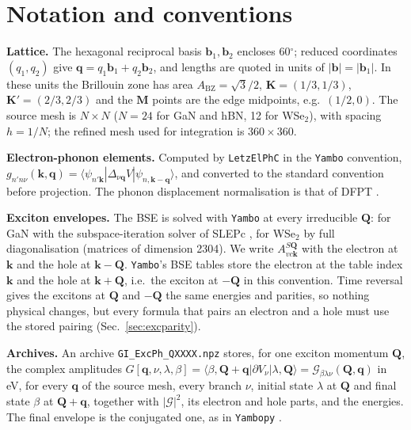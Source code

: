 \documentclass[10pt,a4paper]{article}
\newcommand{\G}{\mathcal{G}}
\newcommand{\bq}{\mathbf{q}}
\newcommand{\bQ}{\mathbf{Q}}
\newcommand{\bk}{\mathbf{k}}
\newcommand{\bK}{\mathbf{K}}
\begin{document}
\section{Notation and conventions}
\label{sec:notation}

\textbf{Lattice.} The hexagonal reciprocal basis $\mathbf{b}_1,\mathbf{b}_2$
encloses 60$^\circ$; reduced coordinates $(q_1,q_2)$ give
$\bq=q_1\mathbf{b}_1+q_2\mathbf{b}_2$, and lengths are quoted in units of
$|\mathbf{b}|=|\mathbf{b}_1|$. In these units the Brillouin zone has area
$A_{\mathrm{BZ}}=\sqrt3/2$, $\bK=(1/3,1/3)$, $\bK'=(2/3,2/3)$ and the
$\mathbf{M}$ points are the edge midpoints, e.g.\ $(1/2,0)$. The source mesh is
$N\times N$ ($N=24$ for GaN and hBN, 12 for WSe$_2$), with spacing $h=1/N$; the
refined mesh used for integration is $360\times360$.

\textbf{Electron-phonon elements.} Computed by \texttt{LetzElPhC}
\cite{LetzElPhC} in the \texttt{Yambo} convention,
$g_{n'n\nu}(\bk,\bq)=\langle\psi_{n'\bk}|\Delta_{\nu\bq}V|\psi_{n,\bk-\bq}\rangle$,
and converted to the standard convention before projection. The phonon
displacement normalisation is that of DFPT \cite{Baroni2001,Giustino2017}.

\textbf{Exciton envelopes.} The BSE is solved with \texttt{Yambo}
\cite{Sangalli2019} at every irreducible $\bQ$: for GaN with the
subspace-iteration solver of SLEPc \cite{Hernandez2005}, for WSe$_2$ by full
diagonalisation (matrices of dimension 2304). We write $A^{S\bQ}_{vc\bk}$ with the electron at
$\bk$ and the hole at $\bk-\bQ$. \texttt{Yambo}'s BSE tables store the electron
at the table index $\bk$ and the hole at $\bk+\bQ$, i.e.\ the exciton at $-\bQ$
in this convention. Time reversal gives the excitons at $\bQ$ and $-\bQ$ the same
energies and parities, so nothing physical changes, but every formula that
pairs an electron and a hole must use the stored pairing (Sec.~\ref{sec:excparity}).

\textbf{Archives.} An archive \texttt{GI\_ExcPh\_QXXXX.npz} stores, for one
exciton momentum $\bQ$, the complex amplitudes
$G[\bq,\nu,\lambda,\beta]=\langle\beta,\bQ+\bq|\partial V_\nu|\lambda,\bQ\rangle=\G_{\beta\lambda\nu}(\bQ,\bq)$
in eV, for every $\bq$ of the source mesh, every branch $\nu$, initial state
$\lambda$ at $\bQ$ and final state $\beta$ at $\bQ+\bq$, together with
$|\G|^2$, its electron and hole parts, and the energies. The final envelope is
the conjugated one, as in \texttt{Yambopy} \cite{Yambopy}.
\end{document}
